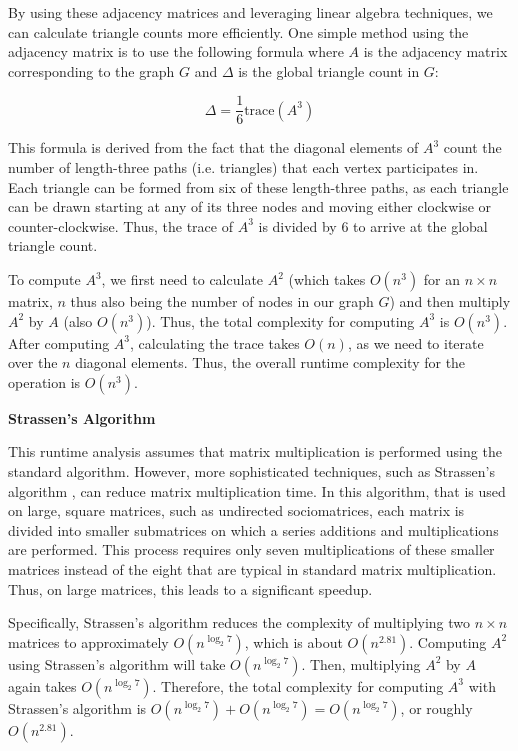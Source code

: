 \documentclass[12pt]{article}
\newcommand{\subsubsubsection}[1]{
  \vspace{1em} %
  \noindent\textbf{#1} %
  \vspace{0.5em} %
}
\begin{document}
By using these adjacency matrices and leveraging linear algebra techniques, we can calculate triangle counts more efficiently. 
One simple method using the adjacency matrix is to use the following formula where $A$ is the adjacency matrix corresponding to the graph $G$ and $\Delta$ is the global triangle count in $G$:

\[
\Delta = \frac{1}{6} \mathrm{trace}(A^3)
\]

This formula is derived from the fact that the diagonal elements of $A^3$ count the number of length-three paths (i.e. triangles) that each vertex participates in.
Each triangle can be formed from six of these length-three paths, as each triangle can be drawn starting at any of its three nodes and moving either clockwise or counter-clockwise.
Thus, the trace of $A^3$ is divided by 6 to arrive at the global triangle count.

To compute $A^3$, we first need to calculate $A^2$ (which takes $O(n^3)$ for an $n \times n$ matrix, $n$ thus also being the number of nodes in our graph $G$) and then multiply $A^2$ by $A$ (also $O(n^3)$).
Thus, the total complexity for computing $A^3$ is $O(n^3)$.
After computing $A^3$, calculating the trace takes $O(n)$, as we need to iterate over the $n$ diagonal elements.
Thus, the overall runtime complexity for the operation is $O(n^3)$.

\subsubsubsection{Strassen's Algorithm}

This runtime analysis assumes that matrix multiplication is performed using the standard algorithm.
However, more sophisticated techniques, such as Strassen's algorithm \cite{strassen_gaussian_1969}, can reduce matrix multiplication time.
In this algorithm, that is used on large, square matrices, such as undirected sociomatrices, each matrix is divided into smaller submatrices on which a series additions and multiplications are performed.
This process requires only seven multiplications of these smaller matrices instead of the eight that are typical in standard matrix multiplication.
Thus, on large matrices, this leads to a significant speedup.

Specifically, Strassen's algorithm reduces the complexity of multiplying two $n \times n$ matrices to approximately $O(n^{\log_2 7})$, which is about $O(n^{2.81})$.
Computing $A^2$ using Strassen's algorithm will take $O(n^{\log_2 7})$.
Then, multiplying $A^2$ by $A$ again takes $O(n^{\log_2 7})$.
Therefore, the total complexity for computing $A^3$ with Strassen's algorithm is $O(n^{\log_2 7}) + O(n^{\log_2 7}) = O(n^{\log_2 7})$, or roughly $O(n^{2.81})$.
\end{document}
